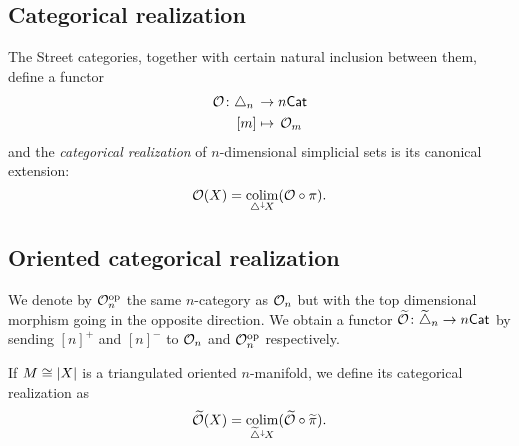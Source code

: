\subsection{Categorical realization}

The Street categories, together with certain natural inclusion between them, define a functor
\[
\begin{split}
	\mathcal{O} \colon \triangle_n \, &\to n\mathsf{Cat} \\
	[m] &\mapsto \, \mathcal{O}_m
\end{split}
\]
and the \textit{categorical realization} of $n$-dimensional simplicial sets is its canonical extension:
\[
\mathcal{O}(X) = \operatorname*{colim}_{\triangle^\downarrow\hspace{-1pt}X} (\mathcal{O} \circ \pi).
\]

\subsection{Oriented categorical realization}

We denote by $\mathcal{O}_n^{\mathrm{op}}$ the same $n$-category as $\mathcal{O}_n$ but with the top dimensional morphism going in the opposite direction.
We obtain a functor $\widetilde{\mathcal{O}} \colon \widetilde{\triangle}_n \to n\mathsf{Cat}$ by sending $[n]^+$ and $[n]^-$ to $\mathcal{O}_n$ and $\mathcal{O}_n^{\mathrm{op}}$ respectively.

If $M \cong \lvert X\rvert$ is a triangulated oriented $n$-manifold, we define its categorical realization as
\[
\widetilde{\mathcal{O}}(X) = \operatorname*{colim}_{\widetilde{\triangle}^\downarrow\hspace{-1pt}X} (\widetilde{\mathcal{O}} \circ \widetilde\pi).
\]